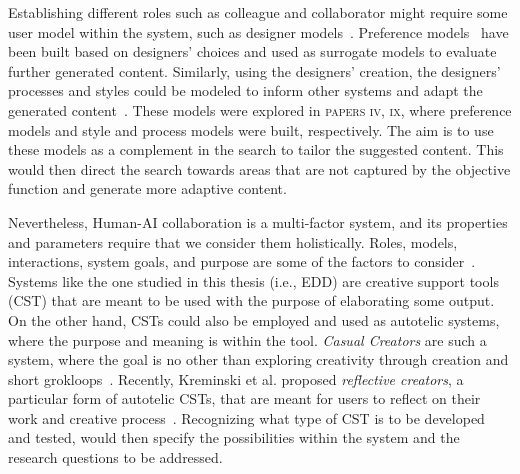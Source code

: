 Establishing different roles such as colleague and collaborator might require some user model within the system, such as designer models~\cite{liapis_designer_2013}. Preference models~\cite{alvarez_learning_2020,liapis_adapting_2012} have been built based on designers' choices and used as surrogate models to evaluate further generated content. Similarly, using the designers' creation, the designers' processes and styles could be modeled to inform other systems and adapt the generated content~\cite{liapis_designer_2014,alvarez_designer_2022,halina_threshold_2022}. These models were explored in \textsc{papers iv, ix}, where preference models and style and process models were built, respectively. The aim is to use these models as a complement in the search to tailor the suggested content. This would then direct the search towards areas that are not captured by the objective function and generate more adaptive content.

Nevertheless, Human-AI collaboration is a multi-factor system, and its properties and parameters require that we consider them holistically. Roles, models, interactions, system goals, and purpose are some of the factors to consider~\cite{chung_intersection_2021}. Systems like the one studied in this thesis (i.e., EDD) are creative support tools (CST) that are meant to be used with the purpose of elaborating some output. On the other hand, CSTs could also be employed and used as autotelic systems, where the purpose and meaning is within the tool. \emph{Casual Creators} are such a system, where the goal is no other than exploring creativity through creation and short grokloops~\cite{compton_casual_2015}. Recently, Kreminski et al. proposed  \emph{reflective creators}, a particular form of autotelic CSTs, that are meant for users to reflect on their work and creative process~\cite{kreminski_reflective_2021}. Recognizing what type of CST is to be developed and tested, would then specify the possibilities within the system and the research questions to be addressed.%


